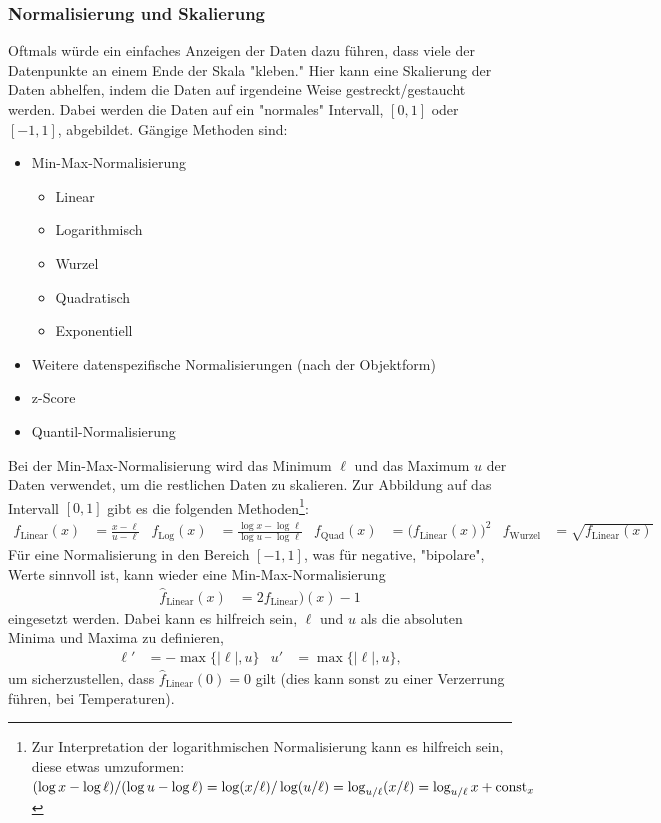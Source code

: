 		\subsubsection{Normalisierung und Skalierung}
			Oftmals würde ein einfaches Anzeigen der Daten dazu führen, dass viele der Datenpunkte an einem Ende der Skala "kleben." Hier kann eine Skalierung der Daten abhelfen, indem die Daten auf irgendeine Weise gestreckt/gestaucht werden. Dabei werden die Daten auf ein "normales" Intervall, \zB \([0, 1]\) oder \([-1, 1]\), abgebildet. Gängige Methoden sind:
			\begin{itemize}
				\item Min-Max-Normalisierung
					\begin{itemize}
						\item Linear
						\item Logarithmisch
						\item Wurzel
						\item Quadratisch
						\item Exponentiell
					\end{itemize}
				\item Weitere datenspezifische Normalisierungen (\bspw nach der Objektform)
				\item z-Score
				\item Quantil-Normalisierung
			\end{itemize}
			Bei der Min-Max-Normalisierung wird das Minimum \(\ell\) und das Maximum \(u\) der Daten verwendet, um die restlichen Daten zu skalieren. Zur Abbildung auf das Intervall \( [0, 1] \) gibt es \zB die folgenden Methoden\footnote{Zur Interpretation der logarithmischen Normalisierung kann es hilfreich sein, diese etwas umzuformen: \( (\log x - \log \ell) / (\log u - \log \ell) = \log(x/\ell) / \log(u/\ell) = \log_{u/\ell}(x/\ell) = \log_{u/\ell} x + \operatorname{const}_x \)}:
			\begin{align}
				f_\text{Linear}(x) & = \frac{x - \ell}{u - \ell}                     &
				f_\text{Log}(x)    & = \frac{\log x - \log \ell}{\log u - \log \ell} &
				f_\text{Quad}(x)   & = \bigl( f_\text{Linear}(x) \bigr)^2            &
				f_\text{Wurzel}    & = \sqrt{f_\text{Linear}(x)}
			\end{align}
			Für eine Normalisierung in den Bereich \( [-1, 1] \), was für negative, "bipolare", Werte sinnvoll ist, kann \zB wieder eine Min-Max-Normalisierung
			\begin{align}
				\hat{f}_\text{Linear}(x) & = 2 f_\text{Linear})(x) - 1
			\end{align}
			eingesetzt werden. Dabei kann es hilfreich sein, \(\ell\) und \(u\) als die absoluten Minima und Maxima zu definieren, \dh
			\begin{align}
				\ell' & = -\max\{ \lvert \ell \rvert, u \} &
				u'    & = \max\{ \lvert \ell \rvert, u \},
			\end{align}
			um sicherzustellen, dass \( \hat{f}_\text{Linear}(0) = 0 \) gilt (dies kann sonst zu einer Verzerrung führen, \bspw bei Temperaturen).

